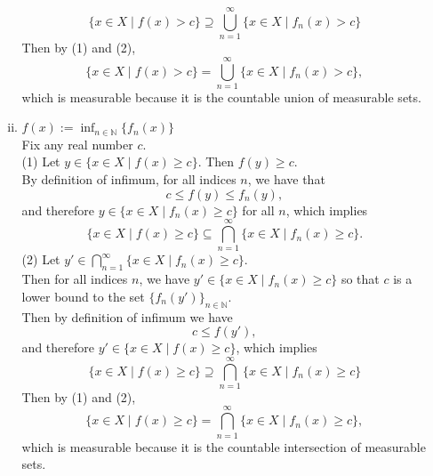 \begin{enumerate}
\begin{enumerate}[(i)]
        \[
            \{x\in X\mid f(x)>c\}\supseteq\bigcup_{n=1}^\infty\{x\in X\mid f_n(x)>c\}\tag{2}
        \]
        Then by (1) and (2),
        \[
            \{x\in X\mid f(x)>c\}=\bigcup_{n=1}^\infty\{x\in X\mid f_n(x)>c\},
        \]
        which is measurable because it is the countable union of measurable sets.
        \item $f(x):=\inf_{n\in\mathbb{N}}\{f_n(x)\}$
        \\Fix any real number $c$.
        \\(1) Let $y\in\{x\in X\mid f(x)\ge c\}$.
        Then $f(y)\ge c$.
        \\By definition of infimum, for all indices $n$, we have that
        \[
            c\le f(y)\le f_n(y),
        \]
        and therefore $y\in\{x\in X\mid f_n(x)\ge c\}$ for all $n$, which implies
        \[
            \{x\in X\mid f(x)\ge c\}\subseteq\bigcap_{n=1}^\infty\{x\in X\mid f_n(x)\ge c\}.\tag{1}
        \]
        (2) Let $y'\in\bigcap_{n=1}^\infty\{x\in X\mid f_n(x)\ge c\}$.
        \\Then for all indices $n$, we have $y'\in\{x\in X\mid f_n(x)\ge c\}$ so that $c$ is a lower bound to the set $\{f_n(y')\}_{n\in\mathbb{N}}$.
        \\Then by definition of infimum we have 
        \[
            c\le f(y'),
        \]
        and therefore $y'\in\{x\in X\mid f(x)\ge c\}$, which implies
        \[
            \{x\in X\mid f(x)\ge c\}\supseteq\bigcap_{n=1}^\infty\{x\in X\mid f_n(x)\ge c\}\tag{2}
        \]
        Then by (1) and (2),
        \[
            \{x\in X\mid f(x)\ge c\}=\bigcap_{n=1}^\infty\{x\in X\mid f_n(x)\ge c\},
        \]
        which is measurable because it is the countable intersection of measurable sets.
        

\end{enumerate}
\end{enumerate}
